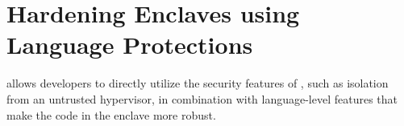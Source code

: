 \section{Hardening Enclaves using Language Protections}
\label{sec:civet:security}

\sysname{} %
allows \java{} developers to directly utilize the security features of \sgx{}, such as isolation from an untrusted hypervisor, %
in combination with language-level features that make the code in the enclave more robust.




